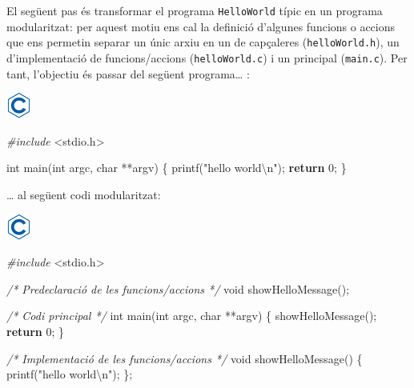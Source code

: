 \documentclass[]{book}
\newenvironment{Shaded}{\begin{snugshade}}{\end{snugshade}}
\newcommand{\CommentTok}[1]{\textcolor[rgb]{0.56,0.35,0.01}{\textit{#1}}}
\newcommand{\ControlFlowTok}[1]{\textcolor[rgb]{0.13,0.29,0.53}{\textbf{#1}}}
\newcommand{\DataTypeTok}[1]{\textcolor[rgb]{0.13,0.29,0.53}{#1}}
\newcommand{\DecValTok}[1]{\textcolor[rgb]{0.00,0.00,0.81}{#1}}
\newcommand{\ImportTok}[1]{#1}
\newcommand{\NormalTok}[1]{#1}
\newcommand{\PreprocessorTok}[1]{\textcolor[rgb]{0.56,0.35,0.01}{\textit{#1}}}
\newcommand{\SpecialCharTok}[1]{\textcolor[rgb]{0.00,0.00,0.00}{#1}}
\newcommand{\StringTok}[1]{\textcolor[rgb]{0.31,0.60,0.02}{#1}}
\begin{document}
El següent pas és transformar el programa \texttt{HelloWorld} típic en un programa modularitzat: per aquest motiu ens cal la definició d'algunes funcions o accions que ens permetin separar un únic arxiu en un de capçaleres (\texttt{helloWorld.h}), un d'implementació de funcions/accions (\texttt{helloWorld.c}) i un principal (\texttt{main.c}). Per tant, l'objectiu és passar del següent programa\ldots{} :

\includegraphics{./img/c.png}

\begin{Shaded}
\begin{Highlighting}[]
\PreprocessorTok{\#include }\ImportTok{\textless{}stdio.h\textgreater{}}

\DataTypeTok{int}\NormalTok{ main(}\DataTypeTok{int}\NormalTok{ argc, }\DataTypeTok{char}\NormalTok{ **argv) \{}
\NormalTok{    printf(}\StringTok{"hello world}\SpecialCharTok{\textbackslash{}n}\StringTok{"}\NormalTok{);}
    \ControlFlowTok{return} \DecValTok{0}\NormalTok{;}
\NormalTok{\}}
\end{Highlighting}
\end{Shaded}

\ldots{} al següent codi modularitzat:

\includegraphics{./img/c.png}

\begin{Shaded}
\begin{Highlighting}[]
\PreprocessorTok{\#include }\ImportTok{\textless{}stdio.h\textgreater{}}

\CommentTok{/* Predeclaració de les funcions/accions */}
\DataTypeTok{void}\NormalTok{ showHelloMessage();}

\CommentTok{/* Codi principal */}
\DataTypeTok{int}\NormalTok{ main(}\DataTypeTok{int}\NormalTok{ argc, }\DataTypeTok{char}\NormalTok{ **argv) \{}
\NormalTok{    showHelloMessage();}
    \ControlFlowTok{return} \DecValTok{0}\NormalTok{;}
\NormalTok{\}}

\CommentTok{/* Implementació de les funcions/accions */}
\DataTypeTok{void}\NormalTok{ showHelloMessage() \{}
\NormalTok{    printf(}\StringTok{"hello world}\SpecialCharTok{\textbackslash{}n}\StringTok{"}\NormalTok{);}
\NormalTok{\};}
\end{Highlighting}
\end{Shaded}
\end{document}
